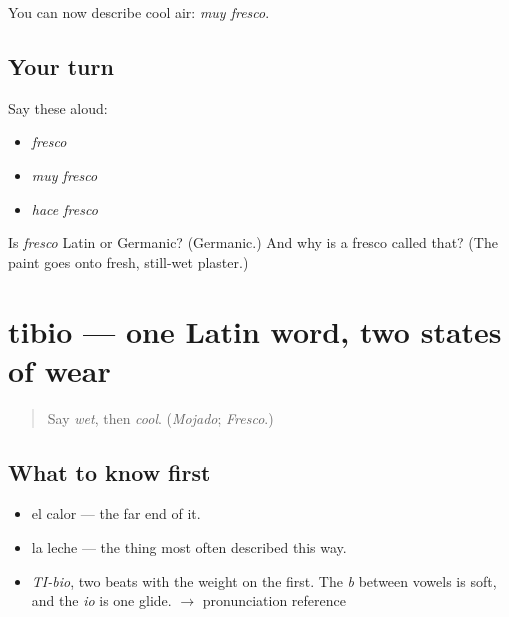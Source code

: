 \begin{grammarlens}[title={What you've built}]
You can now describe cool air: \emph{muy fresco}.
\end{grammarlens}

\subsection*{Your turn}
Say these aloud:

\begin{itemize}
\raggedright
  \item \emph{fresco}
  \item \emph{muy fresco}
  \item \emph{hace fresco}
\end{itemize}

\begin{tcolorbox}[breakable,colback=teal!4,colframe=teal!35!black,title={Before you move on}]
Is \emph{fresco} Latin or Germanic? (Germanic.) And why is a fresco called that? (The paint goes onto fresh, still-wet plaster.)
\end{tcolorbox}
\section[tibio]{tibio — one Latin word, two states of wear}

\label{lesson:ES-C379-tibio}



\begin{quote}
Say \emph{wet}, then \emph{cool}. (\emph{Mojado}; \emph{Fresco}.)
\end{quote}

\subsection*{What to know first}
\begin{itemize}
\raggedright
  \item el calor — the far end of it.
  \item la leche — the thing most often described this way.
\end{itemize}

\begin{sounds}
\begin{itemize}
\raggedright
  \item \emph{TI-bio}, two beats with the weight on the first. The \emph{b} between vowels is soft, and the \emph{io} is one glide. $\to$ pronunciation reference
\end{itemize}
\end{sounds}

